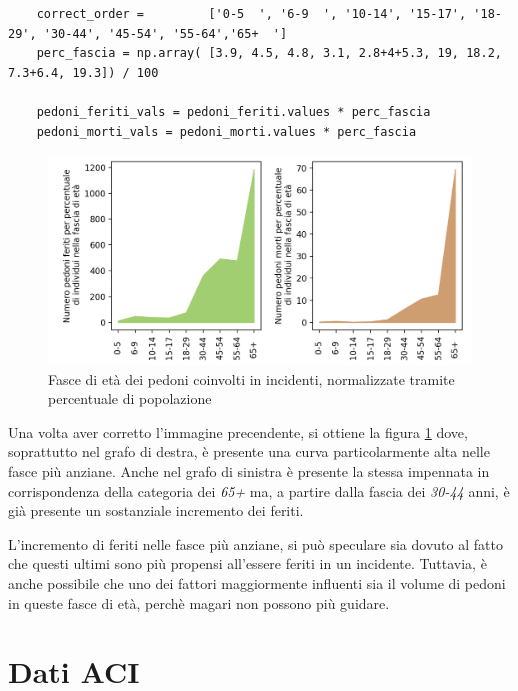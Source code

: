 \documentclass[a4paper]{report}
\begin{document}
\begin{lstlisting}
    correct_order =         ['0-5  ', '6-9  ', '10-14', '15-17', '18-29', '30-44', '45-54', '55-64','65+  ']
    perc_fascia = np.array( [3.9, 4.5, 4.8, 3.1, 2.8+4+5.3, 19, 18.2, 7.3+6.4, 19.3]) / 100

    pedoni_feriti_vals = pedoni_feriti.values * perc_fascia
    pedoni_morti_vals = pedoni_morti.values * perc_fascia
\end{lstlisting}

\begin{figure}
    \includegraphics[width=\linewidth]{../src/incidenti/incidenti_senza_coords/pedoni/eta_pedoni_norm.png}
    \caption{Fasce di età dei pedoni coinvolti in incidenti, normalizzate tramite percentuale di popolazione}
    \label{fig:eta-pedoni-norm}
\end{figure}

Una volta aver corretto l'immagine precendente, si ottiene la figura \ref{fig:eta-pedoni-norm} 
dove, soprattutto nel grafo di destra, è presente una curva particolarmente alta 
nelle fasce più anziane.
Anche nel grafo di sinistra è presente la stessa impennata in corrispondenza 
della categoria dei \textit{65+} ma, a partire dalla fascia 
dei \textit{30-44} anni, è già presente un sostanziale incremento dei feriti.

L'incremento di feriti nelle fasce più anziane, si può speculare sia dovuto al fatto che 
questi ultimi sono più propensi all'essere feriti in un incidente. 
Tuttavia, è anche possibile che uno dei fattori maggiormente influenti sia il 
volume di pedoni in queste fasce di età, perchè magari non possono più guidare.


\section{Dati ACI}
\end{document}
